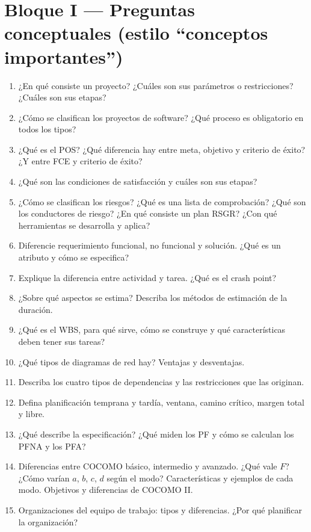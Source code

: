 \documentclass[11pt,a4paper]{article}
\begin{document}
\section{Bloque I --- Preguntas conceptuales (estilo ``conceptos importantes'')}
\begin{enumerate}\small
  \item ¿En qué consiste un proyecto? ¿Cuáles son sus parámetros o restricciones? ¿Cuáles son sus etapas?
  \item ¿Cómo se clasifican los proyectos de software? ¿Qué proceso es obligatorio en todos los tipos?
  \item ¿Qué es el POS? ¿Qué diferencia hay entre meta, objetivo y criterio de éxito? ¿Y entre FCE y criterio de éxito?
  \item ¿Qué son las condiciones de satisfacción y cuáles son sus etapas?
  \item ¿Cómo se clasifican los riesgos? ¿Qué es una lista de comprobación? ¿Qué son los conductores de riesgo?
  ¿En qué consiste un plan RSGR? ¿Con qué herramientas se desarrolla y aplica?
  \item Diferencie requerimiento funcional, no funcional y solución. ¿Qué es un atributo y cómo se especifica?
  \item Explique la diferencia entre actividad y tarea. ¿Qué es el crash point?
  \item ¿Sobre qué aspectos se estima? Describa los métodos de estimación de la duración.
  \item ¿Qué es el WBS, para qué sirve, cómo se construye y qué características deben tener sus tareas?
  \item ¿Qué tipos de diagramas de red hay? Ventajas y desventajas.
  \item Describa los cuatro tipos de dependencias y las restricciones que las originan.
  \item Defina planificación temprana y tardía, ventana, camino crítico, margen total y libre.
  \item ¿Qué describe la especificación? ¿Qué miden los PF y cómo se calculan los PFNA y los PFA?
  \item Diferencias entre COCOMO básico, intermedio y avanzado. ¿Qué vale $F$? ¿Cómo varían $a$, $b$, $c$, $d$ según
  el modo? Características y ejemplos de cada modo. Objetivos y diferencias de COCOMO II.
  \item Organizaciones del equipo de trabajo: tipos y diferencias. ¿Por qué planificar la organización?

\end{enumerate}
\end{document}
